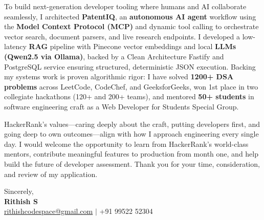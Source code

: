 \documentclass[letterpaper,11pt]{article}
\begin{document}
To build next-generation developer tooling where humans and AI collaborate seamlessly, I architected \textbf{PatentIQ}, an \textbf{autonomous AI agent} workflow using the \textbf{Model Context Protocol (MCP)} and dynamic tool calling to orchestrate vector search, document parsers, and live research endpoints. I developed a low-latency \textbf{RAG} pipeline with Pinecone vector embeddings and local \textbf{LLMs (Qwen2.5 via Ollama)}, backed by a Clean Architecture Fastify and PostgreSQL service ensuring structured, deterministic JSON execution. Backing my systems work is proven algorithmic rigor: I have solved \textbf{1200+ DSA problems} across LeetCode, CodeChef, and GeeksforGeeks, won 1st place in two collegiate hackathons (120+ and 200+ teams), and mentored \textbf{50+ students} in software engineering craft as a Web Developer for Students Special Group.

HackerRank's values---caring deeply about the craft, putting developers first, and going deep to own outcomes---align with how I approach engineering every single day. I would welcome the opportunity to learn from HackerRank's world-class mentors, contribute meaningful features to production from month one, and help build the future of developer assessment. Thank you for your time, consideration, and review of my application.

\vspace{10pt}
Sincerely, \\ \vspace{2pt}
\textbf{Rithish S} \\
\href{mailto:rithishcodespace@gmail.com}{rithishcodespace@gmail.com} $|$ +91 99522 52304
\end{document}
